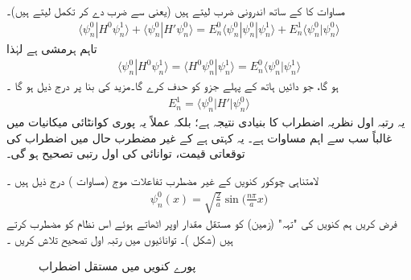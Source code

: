 مساوات  کا  کے ساتھ اندرونی ضرب لیتے ہیں  (یعنی  سے ضرب دے کر تکمل لیتے ہیں)۔ 
\begin{align*}
\langle \psi_n^0 | H^0 \psi_n^1 \rangle + \langle \psi_n^0 | H' \psi_n^0 \rangle = E_n^0 \langle \psi_n^0 | \psi_n^0 | \psi_n^1 \rangle + E_n^1 \langle \psi_n^0 | \psi_n^0 \rangle
\end{align*}
تاہم  ہرمشی ہے لہٰذا
\begin{align*}
\langle \psi_n^0 | H^0 \psi_n^1 \rangle = \langle H^0 \psi_n^0 | \psi_n^1 \rangle = E_n^0 \langle \psi_n^0 | \psi_n^1 \rangle
\end{align*}
 ہو گا،  جو دائیں ہاتھ کے پہلے  جزو کو حدف کرے گا۔مزید   
کی بنا پر درج ذیل ہو گا ۔
\begin{align}\label{مساوات_غیر_اضطراب_اہم_ترین}
E_n^1 = \langle \psi_n^0 | H' | \psi_n^0 \rangle
\end{align}
یہ رتبہ اول نظریہ اضطراب کا بنیادی نتیجہ ہے؛  بلکہ عملاً یہ پوری کوانٹائی  میکانیات میں غالباً سب سے اہم مساوات ہے۔ یہ کہتی ہے کے  غیر  مضطرب حال میں اضطراب کی توقعاتی قیمت،  توانائی کی  اول رتبی   تصحیح ہو گی۔ 

لامتناہی چوکور کنویں کے غیر مضطرب تفاعلات موج (مساوات )   درج ذیل ہیں  ۔
\begin{align*}
\psi_n^0 (x) = \sqrt{\frac{2}{a}} \sin \big (\frac{n \pi}{a} x\big )
\end{align*}
 فرض کریں ہم کنویں کی "تہہ" (زمین)  کو مستقل مقدار  اوپر اٹھاتے ہوئے اس نظام کو مضطرب کرتے ہیں (شکل  )۔   توانائیوں میں رتبہ اول  تصحیح تلاش کریں ۔

\begin{figure}
\centering
{}
\caption{پورے کنویں میں مستقل اضطراب}
\label{شکل_غیر_تابع_اضطراب_چکور_مستقل_اضطراب}
\end{figure}

